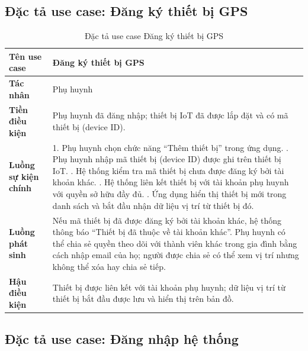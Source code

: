 \documentclass[../DoAn.tex]{subfiles}
\begin{document}
\subsection{Đặc tả use case: Đăng ký thiết bị GPS}

\begin{table}[H]
\centering
\caption{Đặc tả use case Đăng ký thiết bị GPS}
\label{table:uc_device}
\begin{tabular}{|l|p{9.5cm}|}
\hline
\textbf{Tên use case}       & Đăng ký thiết bị GPS \\
\hline
\textbf{Tác nhân}           & Phụ huynh \\
\hline
\textbf{Tiền điều kiện}     & Phụ huynh đã đăng nhập; thiết bị IoT đã được lắp đặt và có mã thiết bị (device ID). \\
\hline
\textbf{Luồng sự kiện chính} &
1. Phụ huynh chọn chức năng ``Thêm thiết bị'' trong ứng dụng. \newline
2. Phụ huynh nhập mã thiết bị (device ID) được ghi trên thiết bị IoT. \newline
3. Hệ thống kiểm tra mã thiết bị chưa được đăng ký bởi tài khoản khác. \newline
4. Hệ thống liên kết thiết bị với tài khoản phụ huynh với quyền sở hữu đầy đủ. \newline
5. Ứng dụng hiển thị thiết bị mới trong danh sách và bắt đầu nhận dữ liệu vị trí từ thiết bị đó. \\
\hline
\textbf{Luồng phát sinh}    & Nếu mã thiết bị đã được đăng ký bởi tài khoản khác, hệ thống thông báo ``Thiết bị đã thuộc về tài khoản khác''. Phụ huynh có thể chia sẻ quyền theo dõi với thành viên khác trong gia đình bằng cách nhập email của họ; người được chia sẻ có thể xem vị trí nhưng không thể xóa hay chia sẻ tiếp. \\
\hline
\textbf{Hậu điều kiện}      & Thiết bị được liên kết với tài khoản phụ huynh; dữ liệu vị trí từ thiết bị bắt đầu được lưu và hiển thị trên bản đồ. \\
\hline
\end{tabular}
\end{table}

\subsection{Đặc tả use case: Đăng nhập hệ thống}
\end{document}
